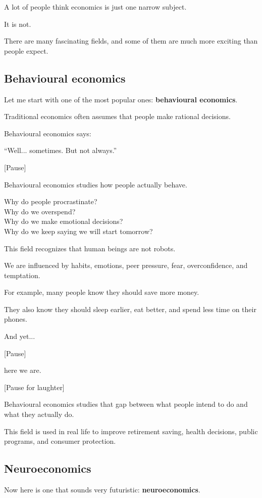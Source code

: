 \documentclass[12pt]{article}
\begin{document}
A lot of people think economics is just one narrow subject.

It is not.

There are many fascinating fields, and some of them are much more exciting than people expect.

\subsection*{Behavioural economics}

Let me start with one of the most popular ones: \textbf{behavioural economics}.

Traditional economics often assumes that people make rational decisions.

Behavioural economics says:

“Well... sometimes. But not always.”

[Pause]

Behavioural economics studies how people actually behave.

Why do people procrastinate?\\
Why do we overspend?\\
Why do we make emotional decisions?\\
Why do we keep saying we will start tomorrow?

This field recognizes that human beings are not robots.

We are influenced by habits, emotions, peer pressure, fear, overconfidence, and temptation.

For example, many people know they should save more money.

They also know they should sleep earlier, eat better, and spend less time on their phones.

And yet...

[Pause]

here we are.

[Pause for laughter]

Behavioural economics studies that gap between what people intend to do and what they actually do.

This field is used in real life to improve retirement saving, health decisions, public programs, and consumer protection.

\subsection*{Neuroeconomics}

Now here is one that sounds very futuristic: \textbf{neuroeconomics}.
\end{document}
